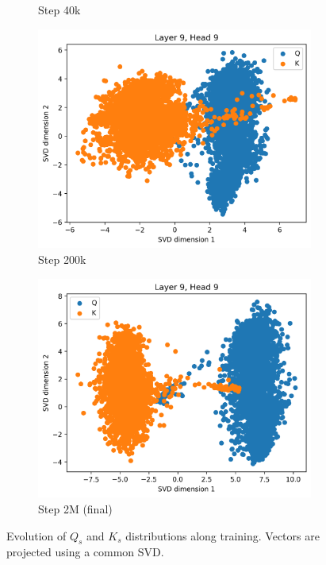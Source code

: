\begin{figure}[ht]
\begin{subfigure}[b]{0.24\linewidth}
         \caption{Step 40k}
         \label{fig:dist_qk_s40}
    \end{subfigure}
    \begin{subfigure}[b]{0.24\linewidth}
         \includegraphics[width=\linewidth]{sources/part_1/anisotropy/imgs/dist_l9h9_s200.png}
         \caption{Step 200k}
         \label{fig:dist_qk_s200}
    \end{subfigure}
    \begin{subfigure}[b]{0.24\linewidth}
         \includegraphics[width=\linewidth]{sources/part_1/anisotropy/imgs/dist_l9h9_s2000.png}
         \caption{Step 2M (final)}
         \label{fig:dist_qk_s2M}
    \end{subfigure}
    \caption{Evolution of $Q_s$ and $K_s$ distributions along training. Vectors are projected using a common SVD.}
    \label{fig:proj_qk_heads}
\end{figure}

